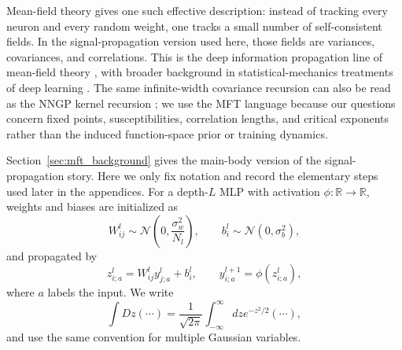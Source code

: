 \documentclass{article}
\theoremstyle{plain}
\theoremstyle{definition}
\theoremstyle{remark}
\begin{document}
Mean-field theory gives one such effective description: instead of tracking every neuron and every random weight, one tracks a small number of self-consistent fields. In the signal-propagation version used here, those fields are variances, covariances, and correlations. This is the deep information propagation line of mean-field theory \cite{poole2016exponentialexpressivitydeepneural,schoenholz2017deepinformationpropagation}, with broader background in statistical-mechanics treatments of deep learning \cite{Bahri2020StatMechDeepLearning,bahri2024leshoucheslecturesdeep}. The same infinite-width covariance recursion can also be read as the NNGP kernel recursion \cite{Lee2018DNNasGP}; we use the MFT language because our questions concern fixed points, susceptibilities, correlation lengths, and critical exponents rather than the induced function-space prior or training dynamics.

Section~\ref{sec:mft_background} gives the main-body version of the signal-propagation story. Here we only fix notation and record the elementary steps used later in the appendices. For a depth-$L$ MLP with activation $\phi:\mathbb R\to\mathbb R$, weights and biases are initialized as
\relax
\begin{equation}
W^{l}_{ij}\sim \mathcal{N}\left(0,\frac{\sigma_{w}^{2}}{N_{l}}\right), \qquad b^{l}_{i}\sim \mathcal{N}\left(0,\sigma_{b}^{2}\right),
\end{equation}
\relax
and propagated by
\relax
\begin{equation}
z^{l}_{i;a}= W^{l}_{ij} y^{l}_{j;a}+b^{l}_{i}, \qquad y^{l+1}_{i;a}=\phi\left(z^{l}_{i;a}\right),
\end{equation}
\relax
where $a$ labels the input. We write
\relax
\begin{equation}
\int Dz (\cdots)=\frac{1}{\sqrt{2\pi}}\int_{-\infty}^{\infty}dz e^{-z^{2}/2}(\cdots),
\end{equation}
\relax
and use the same convention for multiple Gaussian variables.
\end{document}
